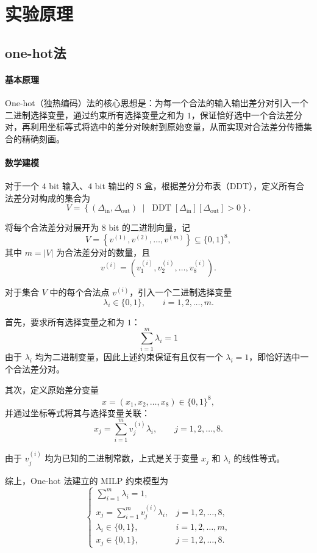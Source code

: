 \section{实验原理}


\subsection{one-hot法}
\paragraph{基本原理}

One-hot（独热编码）法的核心思想是：为每一个合法的输入输出差分对引入一个二进制选择变量，通过约束所有选择变量之和为 $1$，保证恰好选中一个合法差分对，再利用坐标等式将选中的差分对映射到原始变量，从而实现对合法差分传播集合的精确刻画。

\paragraph{数学建模}

对于一个 $4$ bit 输入、$4$ bit 输出的 S 盒，根据差分分布表（DDT），定义所有合法差分对构成的集合为
\[
V=\left\{
(\Delta_{\mathrm{in}},\Delta_{\mathrm{out}})
\;\middle|\;
\operatorname{DDT}[\Delta_{\mathrm{in}}][\Delta_{\mathrm{out}}]>0
\right\}.
\]

将每个合法差分对展开为 $8$ bit 的二进制向量，记
\[
V=\left\{
v^{(1)},v^{(2)},\ldots,v^{(m)}
\right\}
\subseteq \{0,1\}^{8},
\]
其中 $m=|V|$ 为合法差分对的数量，且
\[
v^{(i)}=
\left(v_1^{(i)},v_2^{(i)},\ldots,v_8^{(i)}\right).
\]

对于集合 $V$ 中的每个合法点 $v^{(i)}$，引入一个二进制选择变量
\[
\lambda_i\in\{0,1\},
\qquad i=1,2,\ldots,m.
\]

首先，要求所有选择变量之和为 $1$：
\[
\boxed{
\sum_{i=1}^{m}\lambda_i=1
}
\]
由于 $\lambda_i$ 均为二进制变量，因此上述约束保证有且仅有一个 $\lambda_i=1$，即恰好选中一个合法差分对。

其次，定义原始差分变量
\[
x=(x_1,x_2,\ldots,x_8)\in\{0,1\}^{8},
\]
并通过坐标等式将其与选择变量关联：
\[
\boxed{
x_j=\sum_{i=1}^{m}v_j^{(i)}\lambda_i,
\qquad j=1,2,\ldots,8.
}
\]

由于 $v_j^{(i)}$ 均为已知的二进制常数，上式是关于变量 $x_j$ 和 $\lambda_i$ 的线性等式。

综上，One-hot 法建立的 MILP 约束模型为
\[
\boxed{
\begin{cases}
\displaystyle\sum_{i=1}^{m}\lambda_i=1,\\[6pt]
\displaystyle x_j=\sum_{i=1}^{m}v_j^{(i)}\lambda_i,
& j=1,2,\ldots,8,\\[6pt]
\lambda_i\in\{0,1\},
& i=1,2,\ldots,m,\\[4pt]
x_j\in\{0,1\},
& j=1,2,\ldots,8.
\end{cases}
}
\]

